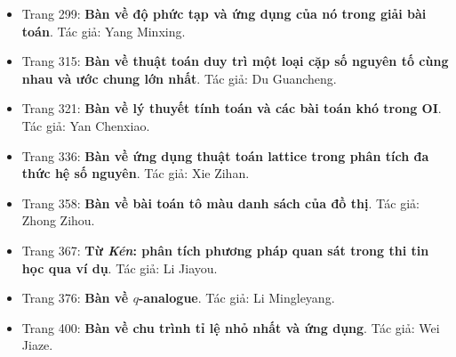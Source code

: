 \documentclass[11pt]{article}
\begin{document}
\begin{itemize}[leftmargin=2em]
  \item Trang 299: \textbf{Bàn về độ phức tạp và ứng dụng của nó trong giải bài toán}. Tác giả: Yang Minxing.
  \item Trang 315: \textbf{Bàn về thuật toán duy trì một loại cặp số nguyên tố cùng nhau và ước chung lớn nhất}. Tác giả: Du Guancheng.
  \item Trang 321: \textbf{Bàn về lý thuyết tính toán và các bài toán khó trong OI}. Tác giả: Yan Chenxiao.
  \item Trang 336: \textbf{Bàn về ứng dụng thuật toán lattice trong phân tích đa thức hệ số nguyên}. Tác giả: Xie Zihan.
  \item Trang 358: \textbf{Bàn về bài toán tô màu danh sách của đồ thị}. Tác giả: Zhong Zihou.
  \item Trang 367: \textbf{Từ \emph{Kén}: phân tích phương pháp quan sát trong thi tin học qua ví dụ}. Tác giả: Li Jiayou.
  \item Trang 376: \textbf{Bàn về \(q\)-analogue}. Tác giả: Li Mingleyang.
  \item Trang 400: \textbf{Bàn về chu trình tỉ lệ nhỏ nhất và ứng dụng}. Tác giả: Wei Jiaze.
\end{itemize}
\end{document}
